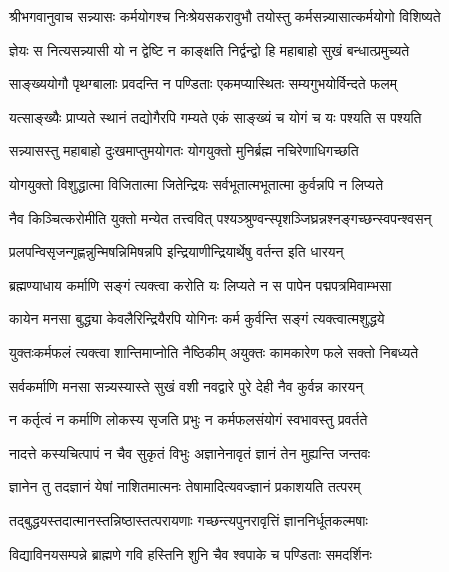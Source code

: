 {श्रीभगवानुवाच}
\twolineshloka
{सन्न्यासः कर्मयोगश्च निःश्रेयसकरावुभौ}
{तयोस्तु कर्मसन्न्यासात्कर्मयोगो विशिष्यते}%

\twolineshloka
{ज्ञेयः स नित्यसन्न्यासी यो न द्वेष्टि न काङ्क्षति}
{निर्द्वन्द्वो हि महाबाहो सुखं बन्धात्प्रमुच्यते}%

\twolineshloka
{साङ्ख्ययोगौ पृथग्बालाः प्रवदन्ति न पण्डिताः}
{एकमप्यास्थितः सम्यगुभयोर्विन्दते फलम्}%

\twolineshloka
{यत्साङ्ख्यैः प्राप्यते स्थानं तद्योगैरपि गम्यते}
{एकं साङ्ख्यं च योगं च यः पश्यति स पश्यति}%

\twolineshloka
{सन्न्यासस्तु महाबाहो दुःखमाप्तुमयोगतः}
{योगयुक्तो मुनिर्ब्रह्म नचिरेणाधिगच्छति}%

\twolineshloka
{योगयुक्तो विशुद्धात्मा विजितात्मा जितेन्द्रियः}
{सर्वभूतात्मभूतात्मा कुर्वन्नपि न लिप्यते}%

\twolineshloka
{नैव किञ्चित्करोमीति युक्तो मन्येत तत्त्ववित्}
{पश्यञ्श्रुण्वन्स्पृशञ्जिघ्रन्नश्नङ्गच्छन्स्वपन्श्वसन्}
{}%

\twolineshloka
{प्रलपन्विसृजन्गृह्णन्नुन्मिषन्निमिषन्नपि}
{इन्द्रियाणीन्द्रियार्थेषु वर्तन्त इति धारयन्}%

\twolineshloka
{ब्रह्मण्याधाय कर्माणि सङ्गं त्यक्त्वा करोति यः}
{लिप्यते न स पापेन पद्मपत्रमिवाम्भसा}%

\twolineshloka
{कायेन मनसा बुद्ध्या केवलैरिन्द्रियैरपि}
{योगिनः कर्म कुर्वन्ति सङ्गं त्यक्त्वात्मशुद्धये}%

\twolineshloka
{युक्तःकर्मफलं त्यक्त्वा शान्तिमाप्नोति नैष्ठिकीम्}
{अयुक्तः कामकारेण फले सक्तो निबध्यते}%

\twolineshloka
{सर्वकर्माणि मनसा सन्न्यस्यास्ते सुखं वशी}
{नवद्वारे पुरे देही नैव कुर्वन्न कारयन्}%

\twolineshloka
{न कर्तृत्वं न कर्माणि लोकस्य सृजति प्रभुः}
{न कर्मफलसंयोगं स्वभावस्तु प्रवर्तते}%

\twolineshloka
{नादत्ते कस्यचित्पापं न चैव सुकृतं विभुः}
{अज्ञानेनावृतं ज्ञानं तेन मुह्यन्ति जन्तवः}%

\twolineshloka
{ज्ञानेन तु तदज्ञानं येषां नाशितमात्मनः}
{तेषामादित्यवज्ज्ञानं प्रकाशयति तत्परम्}%

\twolineshloka
{तद्बुद्धयस्तदात्मानस्तन्निष्ठास्तत्परायणाः}
{गच्छन्त्यपुनरावृत्तिं ज्ञाननिर्धूतकल्मषाः}%

\twolineshloka
{विद्याविनयसम्पन्ने ब्राह्मणे गवि हस्तिनि}
{शुनि चैव श्वपाके च पण्डिताः समदर्शिनः}%

